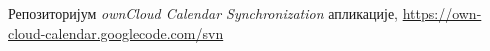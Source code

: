 %
%
\begin{thebibliography}{11}









 {Репозиторијум {\it ownCloud Calendar Synchronization} апликације, \url{https://own-cloud-calendar.googlecode.com/svn}}

\end{thebibliography}

